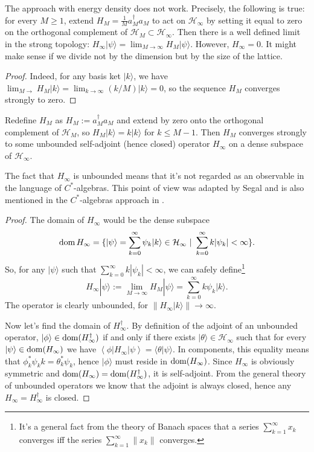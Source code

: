 	\begin{statement}
	The approach with energy density does not work. Precisely, the following is true: for every $M \geq 1$, extend $H_M = \frac{1}{M} a_M^\dagger a_M$ to act on $\mathcal{H}_\infty$ by setting it equal to zero on the orthogonal complement of $\mathcal H_{M} \subset \mathcal H_{\infty}$. Then there is a well defined limit in the strong topology: $H_{\infty}|\psi \rangle = \lim_{M \rightarrow \infty} H_{M}|\psi \rangle$. However, $H_{\infty} = 0$. It might make sense if we divide not by the dimension but by the size of the lattice.
	\end{statement}
	\begin{proof}
	Indeed, for any basis ket $|k\rangle$, we have $\lim_{M \rightarrow} H_M|k\rangle = \lim_{k \rightarrow \infty}(k/M)|k\rangle = 0$, so the sequence $H_M$ converges strongly to zero.
	\end{proof}
	\begin{statement}
	Redefine $H_M$ as $H_M := a_M^\dagger a_M$ and extend by zero onto the orthogonal complement of $\mathcal H_{M}$, so $H_M |k \rangle = k |k\rangle$ for $k \leq M-1$. Then $H_M$ converges strongly to some unbounded self-adjoint (hence closed) operator $H_{\infty}$ on a dense subspace of $\mathcal H_{\infty}$.
	\end{statement}
	The fact that $H_{\infty}$ is unbounded means that it's not regarded as an observable in the language of $C^*$-algebras. This point of view was adapted by Segal and is also mentioned in the $C^*$-algebras approach in \cite{haag_alg}.
	\begin{proof}
The domain of $H_{\infty}$ would be the dense subspace
\[
\operatorname{dom} H_{\infty} = \{ |\psi\rangle = \sum_{k=0}^\infty \psi_k |k \rangle \in \mathcal H_{\infty} \ | \ \sum_{k=0}^\infty k |\psi_k| < \infty \}.
\]
So, for any $|\psi\rangle$ such that $\sum_{k=0}^\infty k |\psi_k| < \infty$, we can safely define\footnote{It's a general fact from the theory of Banach spaces that a series $\sum_{k=1}^\infty x_k$ converges iff the series $\sum_{k=1}^\infty \|x_k\|$ converges.}
\[
H_{\infty}|\psi \rangle :=\lim_{M \rightarrow \infty} H_{M}|\psi \rangle = \sum_{k=0}^\infty k\psi_k |k \rangle.
\]
The operator is clearly unbounded, for $\|H_{\infty}|k\rangle\| \rightarrow \infty$.

Now let's find the domain of $H_{\infty}^\dagger$. By definition of the adjoint of an unbounded operator, $|\phi \rangle \in \operatorname{dom} (H_{\infty}^\dagger)$ if and only if there exists $|\theta\rangle \in \mathcal H_{\infty}$ such that for every $|\psi \rangle \in \operatorname{dom}(H_{\infty})$ we have $\left\langle \phi | H_{\infty} | \psi \right\rangle = \langle \theta | \psi \rangle$. In components, this equality means that $\phi_k^* \psi_k k = \theta_k^* \psi_k$, hence $|\phi\rangle$ must reside in $\operatorname{dom}(H_\infty)$. Since $H_{\infty}$ is obviously symmetric and $\operatorname{dom}(H_{\infty}) = \operatorname{dom}(H_{\infty}^\dagger)$, it is self-adjoint. From the general theory of unbounded operators we know that the adjoint is always closed, hence any $H_{\infty} = H_{\infty}^\dagger$ is closed.
	\end{proof}
	
